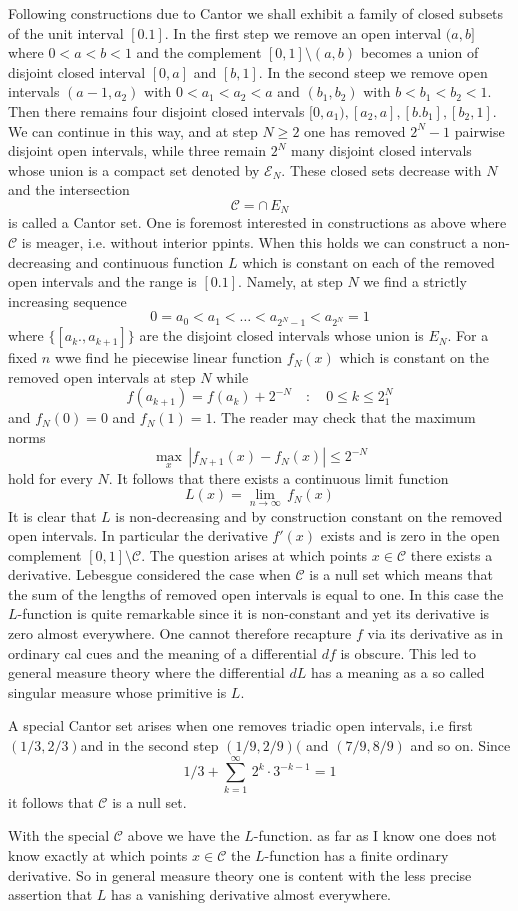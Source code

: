 \documentclass{amsart}
\begin{document}
\bigskip

\noindent
Following constructions due to Cantor  we
shall exhibit a family of closed subsets of the unit interval $[0.1]$.
In the first step we remove an open interval $(a,b]$ where
$0<a<b<1$ and the complement
$[0,1]\setminus (a,b)$ becomes a union of disjoint closed interval $[0,a]$ and $[b,1]$.
In the second steep we remove open intervals $(a-1,a_2)$ with
$0<a_1<a_2<a$ and $(b_1,b_2)$ with $b<b_1<b_2<1$.
Then there remains four disjoint closed intervals
$[0,a_1), [a_2,a], [b.b_1], [b_2,1]$.
We can continue in this way, and at step $N\geq 2$
one has removed $2^N-1$  pairwise  disjoint open intervals, while three remain $2^N$ many disjoint closed intervals
whose union is a compact set denoted by $\mathcal E_N$. These closed sets decrease with $N$ and the intersection
\[
\mathcal C= \cap \, E_N
\] 
is called  a Cantor  set.
One is foremost interested in
constructions as above where
$\mathcal C$ is meager, i.e. without interior ppints.
When this holds we can construct a non-decreasing and continuous function
$L$ which is constant on each of the removed open intervals
and the range is $[0.1]$.
Namely, at step $N$
we find a strictly increasing sequence
\[
0=a_0<a_1<\ldots <a_{2^N-1}<a_{2^N}=1
\]
where $\{[a_k.,a_{k+1}]\}$
are the disjoint closed intervals whose union is $E_N$.
For a fixed $n$ wwe find he
piecewise linear function $f_N(x)$
which  is constant on the removed open intervals at step $N$
while
\[ 
f(a_{k+1})= f(a_k)+ 2^{-N}\quad\colon\quad 0\leq k\leq 2^N_1
\]
and $f_N(0)=0$ and $f_N(1)=1$.
The reader may check that
the maximum norms
\[
\max_x\, |f_{N+1}(x)-f_N(x)|\leq 2^{-N}
\]
hold for every $N$.
It follows that there exists a continuous limit function
\[
L(x)= \lim_{n\to \infty}\, f_N(x)
\]
It is clear that $L$ is non-decreasing and by construction constant on
the removed open intervals. In particular the derivative
$f'(x)$ exists and is zero in the open complement
$[0,1]\setminus\mathcal C$.
The question arises at which points $x\in\mathcal C$  there  exists a derivative.
Lebesgue considered the case when
$\mathcal C$ is a null set which means that
the sum of the lengths of removed open intervals is equal to one.
In this case the $L$-function is quite remarkable since
it is non-constant and yet its derivative is zero almost everywhere.
One cannot therefore recapture $f$ via its derivative as in ordinary cal cues
and the meaning of a differential $df$ is obscure.
This led to general measure theory where
the differential $dL$ has a meaning 
as a  so called singular measure whose primitive  is $L$.
\medskip

\noindent
A special  Cantor  set  arises when one removes triadic open intervals,  i.e first
$(1/3,2/3)$and in the second step
$(1/9,2/9)($ and $(7/9,8/9)$ and so on. Since
\[
1/3+\sum_{k=1}^{\infty}\, 2^k\cdot 3^{-k-1}=1
\]
it follows that $\mathcal C$ is a null set.
\medskip


With the special $\mathcal C$ above we have the $L$-function. as far as I know one does not 
know exactly at which points $x\in\mathcal C$ the $L$-function has a finite ordinary derivative.
So in general measure theory one is content with
the
less precise assertion that $L$ has a vanishing derivative almost everywhere.
\end{document}
